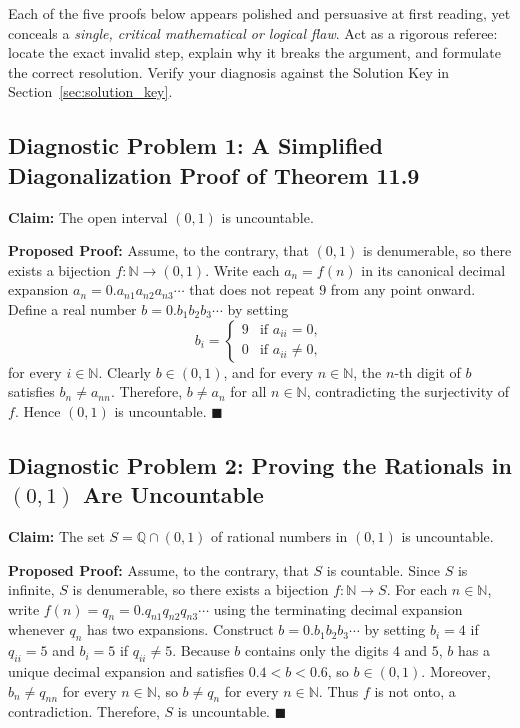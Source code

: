 \documentclass[11pt, letterpaper]{article}
\theoremstyle{definition}
\theoremstyle{remark}
\begin{document}
Each of the five proofs below appears polished and persuasive at first reading, yet conceals a \emph{single, critical mathematical or logical flaw}. Act as a rigorous referee: locate the exact invalid step, explain why it breaks the argument, and formulate the correct resolution. Verify your diagnosis against the Solution Key in Section~\ref{sec:solution_key}.

\subsection{Diagnostic Problem 1: A Simplified Diagonalization Proof of Theorem 11.9}

\textbf{Claim:} The open interval $(0, 1)$ is uncountable.

\textbf{Proposed Proof:} Assume, to the contrary, that $(0, 1)$ is denumerable, so there exists a bijection $f : \mathbb{N} \to (0, 1)$. Write each $a_n = f(n)$ in its canonical decimal expansion $a_n = 0.a_{n1}a_{n2}a_{n3}\cdots$ that does not repeat $9$ from any point onward. Define a real number $b = 0.b_1 b_2 b_3 \cdots$ by setting
\[
b_i = \begin{cases}
9 & \text{if } a_{ii} = 0, \\
0 & \text{if } a_{ii} \neq 0,
\end{cases}
\]
for every $i \in \mathbb{N}$. Clearly $b \in (0, 1)$, and for every $n \in \mathbb{N}$, the $n$-th digit of $b$ satisfies $b_n \neq a_{nn}$. Therefore, $b \neq a_n$ for all $n \in \mathbb{N}$, contradicting the surjectivity of $f$. Hence $(0, 1)$ is uncountable. $\blacksquare$

\subsection{Diagnostic Problem 2: Proving the Rationals in $(0, 1)$ Are Uncountable}

\textbf{Claim:} The set $S = \mathbb{Q} \cap (0, 1)$ of rational numbers in $(0, 1)$ is uncountable.

\textbf{Proposed Proof:} Assume, to the contrary, that $S$ is countable. Since $S$ is infinite, $S$ is denumerable, so there exists a bijection $f : \mathbb{N} \to S$. For each $n \in \mathbb{N}$, write $f(n) = q_n = 0.q_{n1}q_{n2}q_{n3}\cdots$ using the terminating decimal expansion whenever $q_n$ has two expansions. Construct $b = 0.b_1 b_2 b_3 \cdots$ by setting $b_i = 4$ if $q_{ii} = 5$ and $b_i = 5$ if $q_{ii} \neq 5$. Because $b$ contains only the digits $4$ and $5$, $b$ has a unique decimal expansion and satisfies $0.4 < b < 0.6$, so $b \in (0, 1)$. Moreover, $b_n \neq q_{nn}$ for every $n \in \mathbb{N}$, so $b \neq q_n$ for every $n \in \mathbb{N}$. Thus $f$ is not onto, a contradiction. Therefore, $S$ is uncountable. $\blacksquare$
\end{document}
